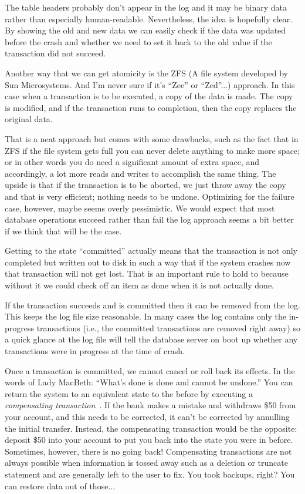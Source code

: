 The table headers probably don't appear in the log and it may be binary data rather than especially human-readable. Nevertheless, the idea is hopefully clear. By showing the old and new data we can easily check if the data was updated before the crash and whether we need to set it back to the old value if the transaction did not succeed. 

Another way that we can get atomicity is the ZFS (A file system developed by Sun Microsystems. And I'm never sure if it's ``Zee'' or ``Zed''...) approach. In this case when a transaction is to be executed, a copy of the data is made. The copy is modified, and if the transaction runs to completion, then the copy replaces the original data. 

That is a neat approach but comes with some drawbacks, such as the fact that in ZFS if the file system gets full you can never delete anything to make more space; or in other words you do need a significant amount of extra space, and accordingly, a lot more reads and writes to accomplish the same thing. The upside is that if the transaction is to be aborted, we just throw away the copy and that is very efficient; nothing needs to be undone. Optimizing for the failure case, however, maybe seems overly pessimistic. We would expect that most database operations succeed rather than fail the log approach seems a bit better if we think that will be the case.

Getting to the state ``committed'' actually means that the transaction is not only completed but written out to disk in such a way that if the system crashes now that transaction will not get lost. That is an important rule to hold to because without it we could check off an item as done when it is not actually done.

If the transaction succeeds and is committed then it can be removed from the log. This keeps the log file size reasonable. In many cases the log contains only the in-progress transactions (i.e., the committed transactions are removed right away) so a quick glance at the log file will tell the database server on boot up whether any transactions were in progress at the time of crash.

Once a transaction is committed, we cannot cancel or roll back its effects. In the words of Lady MacBeth: ``What's done is done and cannot be undone.'' You can return the system to an equivalent state to the before by executing a \textit{compensating transaction}~\cite{dsc}. If the bank makes a mistake and withdraws \$50 from your account, and this needs to be corrected, it can't be corrected by annulling the initial transfer. Instead, the compensating transaction would be the opposite: deposit \$50 into your account to put you back into the state you were in before. Sometimes, however, there is no going back! Compensating transactions are not always possible when information is tossed away such as a deletion or truncate statement and are generally left to the user to fix. You took backups, right? You can restore data out of those... 

